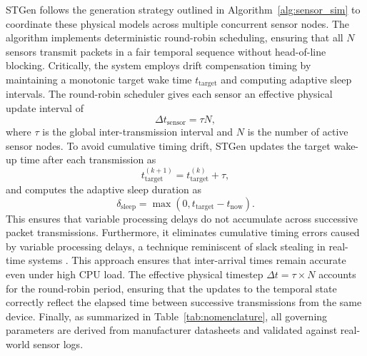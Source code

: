 \documentclass[jsan,article,submit,moreauthors,pdftex]{Definitions/mdpi}
\begin{document}
STGen follows the generation strategy outlined in Algorithm~\ref{alg:sensor_sim} to coordinate these physical models across multiple concurrent sensor nodes. The algorithm implements deterministic round-robin scheduling, ensuring that all $N$ sensors transmit packets in a fair temporal sequence without head-of-line blocking. Critically, the system employs drift compensation timing by maintaining a monotonic target wake time $t_{\text{target}}$ and computing adaptive sleep intervals. The round-robin scheduler gives each sensor an effective physical update interval of
\begin{equation}
\Delta t_{\mathrm{sensor}} = \tau N ,
\end{equation}
where $\tau$ is the global inter-transmission interval and $N$ is the number of active sensor nodes. To avoid cumulative timing drift, STGen updates the target wake-up time after each transmission as
\begin{equation}
t_{\mathrm{target}}^{(k+1)} = t_{\mathrm{target}}^{(k)} + \tau ,
\end{equation}
and computes the adaptive sleep duration as
\begin{equation}
\delta_{\mathrm{sleep}} = \max\left(0, t_{\mathrm{target}} - t_{\mathrm{now}}\right).
\end{equation}
This ensures that variable processing delays do not accumulate across successive packet transmissions. Furthermore, it eliminates cumulative timing errors caused by variable processing delays, a technique reminiscent of slack stealing in real-time systems \cite{lehoczky1992slack}. This approach  ensures that inter-arrival times remain accurate even under high CPU load. The effective physical timestep $\Delta t = \tau \times N$ accounts for the round-robin period, ensuring that the updates to the temporal state correctly reflect the elapsed time between successive transmissions from the same device. Finally, as summarized in Table~\ref{tab:nomenclature}, all governing parameters are derived from manufacturer datasheets and validated against real-world sensor logs.
\end{document}
